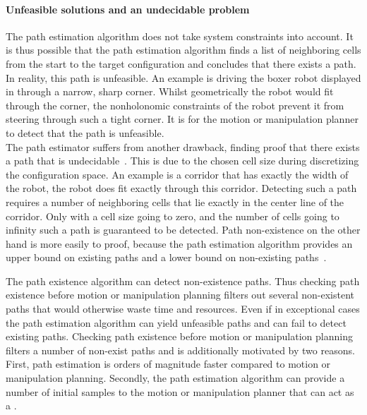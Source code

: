 \paragraph{Unfeasible solutions and an undecidable problem}
The path estimation algorithm does not take system constraints into account. It is thus possible that the path estimation algorithm finds a list of neighboring cells from the start to the target configuration and concludes that there exists a path. In reality, this path is unfeasible. An example is driving the boxer robot displayed in  through a narrow, sharp corner. Whilst geometrically the robot would fit through the corner, the nonholonomic constraints of the robot prevent it from steering through such a tight corner. It is for the motion or manipulation planner to detect that the path is unfeasible.\\

The path estimator suffers from another drawback, finding proof that there exists a path that is undecidable~\cite{zhang_simple_2008}. This is due to the chosen cell size during discretizing the configuration space. An example is a corridor that has exactly the width of the robot, the robot does fit exactly through this corridor. Detecting such a path requires a number of neighboring cells that lie exactly in the center line of the corridor. Only with a cell size going to zero, and the number of cells going to infinity such a path is guaranteed to be detected. Path non-existence on the other hand is more easily to proof, because the path estimation algorithm provides an upper bound on existing paths and a lower bound on non-existing paths~\cite{zhang_simple_2008}.\bs

The path existence algorithm can detect non-existence paths. Thus checking path existence before motion or manipulation planning filters out several non-existent paths that would otherwise waste time and resources. Even if in exceptional cases the path estimation algorithm can yield unfeasible paths and can fail to detect existing paths. Checking path existence before motion or manipulation planning filters a number of non-exist paths and is additionally motivated by two reasons. First, path estimation is orders of magnitude faster compared to motion or manipulation planning. Secondly, the path estimation algorithm can provide a number of initial samples to the motion or manipulation planner that can act as a .


